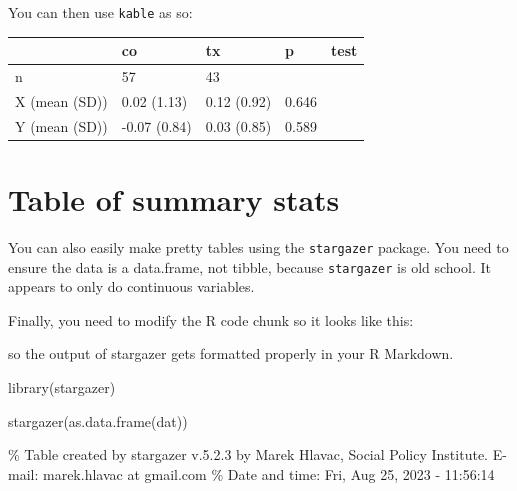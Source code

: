 \documentclass[
  letterpaper,
  DIV=11,
  numbers=noendperiod]{scrreprt}
\newenvironment{Shaded}{\begin{snugshade}}{\end{snugshade}}
\newcommand{\AttributeTok}[1]{\textcolor[rgb]{0.49,0.56,0.16}{#1}}
\newcommand{\ConstantTok}[1]{\textcolor[rgb]{0.53,0.00,0.00}{#1}}
\newcommand{\FunctionTok}[1]{\textcolor[rgb]{0.02,0.16,0.49}{#1}}
\newcommand{\NormalTok}[1]{\textcolor[rgb]{0.00,0.44,0.13}{#1}}
\newcommand{\SpecialCharTok}[1]{\textcolor[rgb]{0.25,0.44,0.63}{#1}}
\begin{document}
You can then use \texttt{kable} as so:

\begin{Shaded}
\end{Shaded}

\begin{longtable}[]{@{}lllll@{}}
\toprule\noalign{}
& co & tx & p & test \\
\midrule\noalign{}
\endhead
\bottomrule\noalign{}
\endlastfoot
n & 57 & 43 & & \\
X (mean (SD)) & 0.02 (1.13) & 0.12 (0.92) & 0.646 & \\
Y (mean (SD)) & -0.07 (0.84) & 0.03 (0.85) & 0.589 & \\
\end{longtable}

\hypertarget{table-of-summary-stats}{%
\section{Table of summary stats}\label{table-of-summary-stats}}

You can also easily make pretty tables using the \texttt{stargazer}
package. You need to ensure the data is a data.frame, not tibble,
because \texttt{stargazer} is old school. It appears to only do
continuous variables.

Finally, you need to modify the R code chunk so it looks like this:

so the output of stargazer gets formatted properly in your R Markdown.

\begin{Shaded}
\begin{Highlighting}[]
\FunctionTok{library}\NormalTok{(stargazer)}

\FunctionTok{stargazer}\NormalTok{(}\FunctionTok{as.data.frame}\NormalTok{(dat))}
\end{Highlighting}
\end{Shaded}

\% Table created by stargazer v.5.2.3 by Marek Hlavac, Social Policy
Institute. E-mail: marek.hlavac at gmail.com \% Date and time: Fri, Aug
25, 2023 - 11:56:14
\end{document}
